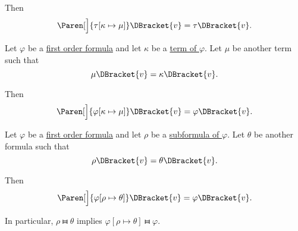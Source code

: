\begin{proposition}
\begin{PropEnum}
    Then
    \begin{equation}\label{eq:thm:first_order_substitution_equivalence/term_in_term}
      \Paren[\Big]{ \tau[\kappa \mapsto \mu] }\DBracket{v} = \tau\DBracket{v}.
    \end{equation}

     Let \( \varphi \) be a \hyperref[def:first_order_syntax/formula]{first order formula} and let \( \kappa \) be a \hyperref[def:first_order_syntax/formula_terms]{term of \( \varphi \)}. Let \( \mu \) be another term such that
    \begin{equation}\label{eq:thm:first_order_substitution_equivalence/term_in_formula/compatibility}
      \mu\DBracket{v} = \kappa\DBracket{v}.
    \end{equation}

    Then
    \begin{equation}\label{eq:thm:first_order_substitution_equivalence/term_in_formula}
      \Paren[\Big]{ \varphi[\kappa \mapsto \mu] }\DBracket{v} = \varphi\DBracket{v}.
    \end{equation}

     Let \( \varphi \) be a \hyperref[def:first_order_syntax/formula]{first order formula} and let \( \rho \) be a \hyperref[def:first_order_syntax/subformula]{subformula of \( \varphi \)}. Let \( \theta \) be another formula such that
    \begin{equation}\label{eq:thm:first_order_substitution_equivalence/formula_in_formula/compatibility}
      \rho\DBracket{v} = \theta\DBracket{v}.
    \end{equation}

    Then
    \begin{equation}\label{eq:thm:first_order_substitution_equivalence/formula_in_formula}
      \Paren[\Big]{ \varphi[\rho \mapsto \theta] }\DBracket{v} = \varphi\DBracket{v}.
    \end{equation}

    In particular, \( \rho \gleichstark \theta \) implies \( \varphi[\rho \mapsto \theta] \gleichstark \varphi \).
  \end{PropEnum}
\end{proposition}
